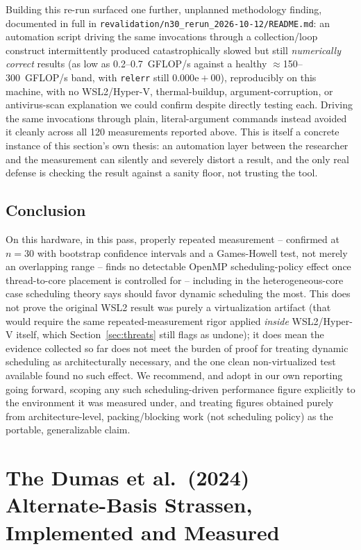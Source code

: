 \documentclass[acmsmall]{acmart}
\begin{document}
Building this re-run surfaced one further, unplanned methodology
finding, documented in full in
\texttt{revalidation/n30\_rerun\_2026-10-12/README.md}: an automation
script driving the same invocations through a collection/loop
construct intermittently produced catastrophically slowed but still
\emph{numerically correct} results (as low as 0.2--0.7~GFLOP/s against
a healthy $\approx$150--300~GFLOP/s band, with \texttt{relerr} still
$0.000\mathrm{e}{+}00$), reproducibly on this machine, with no
WSL2/Hyper-V, thermal-buildup, argument-corruption, or antivirus-scan
explanation we could confirm despite directly testing each. Driving the
same invocations through plain, literal-argument commands instead
avoided it cleanly across all 120 measurements reported above. This is
itself a concrete instance of this section's own thesis: an automation
layer between the researcher and the measurement can silently and
severely distort a result, and the only real defense is checking the
result against a sanity floor, not trusting the tool.

\subsection{Conclusion}
On this hardware, in this pass, properly repeated measurement --
confirmed at $n{=}30$ with bootstrap confidence intervals and a
Games-Howell test, not merely an overlapping range -- finds no
detectable OpenMP scheduling-policy effect once thread-to-core placement
is controlled for -- including in the heterogeneous-core case scheduling
theory says should favor dynamic scheduling the most. This does not
prove the original WSL2 result was purely a virtualization artifact
(that would require the same repeated-measurement rigor applied
\emph{inside} WSL2/Hyper-V itself, which Section~\ref{sec:threats}
still flags as undone); it does mean the evidence collected so far does
not meet the
burden of proof for treating dynamic scheduling as architecturally
necessary, and the one clean non-virtualized test available found no
such effect. We recommend, and adopt in our own reporting going forward,
scoping any such scheduling-driven performance figure explicitly to the
environment it was measured under, and treating figures obtained purely
from architecture-level, packing/blocking work (not scheduling policy)
as the portable, generalizable claim.

\section{The Dumas et al.\ (2024) Alternate-Basis Strassen, Implemented and Measured}
\label{sec:dumas}
\end{document}
